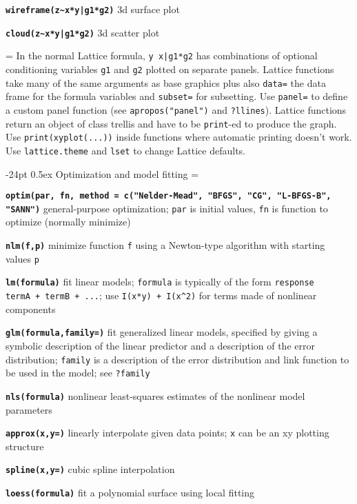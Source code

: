 \documentclass[8pt,landscape]{article}
\makeatletter
\renewcommand\section{\@startsection{section}{1}{0mm}%
                                     {-24pt}%
                                     {0.5ex}%
                                {\color{blue}\normalfont\large\bfseries}}
\newcommand{\code}{\texttt}
\newcommand{\bcode}[1]{\texttt{\textbf{#1}}}
\makeatother
\begin{document}
\begin{multicols*}{3}
\bcode{wireframe(z\~{}x*y|g1*g2)}  3d surface plot

\bcode{cloud(z\~{}x*y|g1*g2)}  3d scatter plot

\everypar={\hangindent=0mm}
In the normal Lattice formula, \code{y~x|g1*g2} has
combinations of optional conditioning variables \code{g1}
and \code{g2} plotted on separate panels. Lattice functions 
take many of the same arguments as base
graphics plus also \code{data=} the data frame for the formula
variables and \code{subset=} for subsetting. Use \code{panel=} to
define a custom panel function (see \code{apropos("panel")}
and \code{?llines}). Lattice functions return an object of class
trellis and have to be \code{print}-ed to produce the graph. Use
\code{print(xyplot(...))} inside functions where automatic
printing doesn't work. Use \code{lattice.theme} and \code{lset} to
change Lattice defaults.



\section{Optimization and model fitting}
\everypar={\hangindent=9mm}

\bcode{optim(par, fn, method = c("Nelder-Mead", "BFGS", "CG",
  "L-BFGS-B", "SANN")} general-purpose optimization; \code{par} is
  initial values, \code{fn} is function to optimize (normally minimize)

\bcode{nlm(f,p)} minimize function \code{f} using a Newton-type
algorithm with starting values \code{p}

\bcode{lm(formula)} fit linear models; \code{formula} is typically of
     the form \code{response ~ termA + termB + ...}; use \code{I(x*y)
     + I(x\^{}2)} for terms made of nonlinear components

\bcode{glm(formula,family=)} fit generalized linear models, specified by
     giving a symbolic description of the linear predictor and a
     description of the error distribution; \code{family} is a
     description of the error distribution and link function to
          be used in the model; see \code{?family}

\bcode{nls(formula)} nonlinear least-squares estimates of the nonlinear
     model parameters

\bcode{approx(x,y=)} linearly interpolate given data points; \code{x} can be an
xy plotting structure

\bcode{spline(x,y=)} cubic spline interpolation

\bcode{loess(formula)} fit a polynomial surface using local fitting


\end{multicols*}
\end{document}

